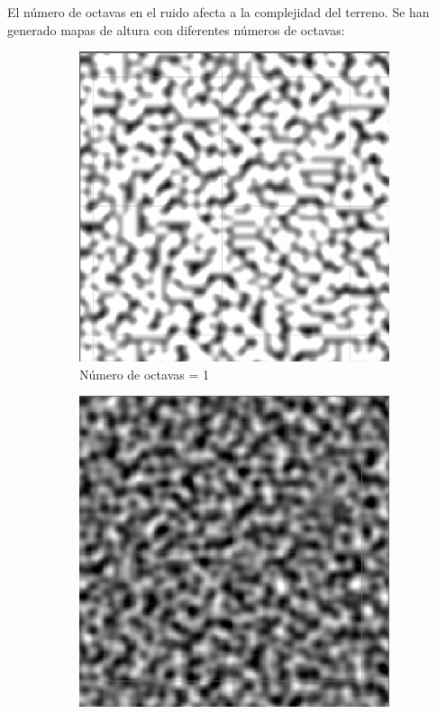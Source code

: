 El número de octavas en el ruido afecta a la complejidad del terreno. Se han generado mapas de altura con diferentes números de octavas:
\begin{figure}[ht]
    \begin{subfigure}{0.3\linewidth}
        \centering
        \includegraphics[width=\linewidth]{img/codes/MediumNoiseScale.png}
        \caption{Número de octavas = 1 }
    \end{subfigure}
    \hfill
    \begin{subfigure}{0.3\linewidth}
        \centering
        \includegraphics[width=\linewidth]{img/codes/MediumOctaves.png}

\end{subfigure}
\end{figure}
